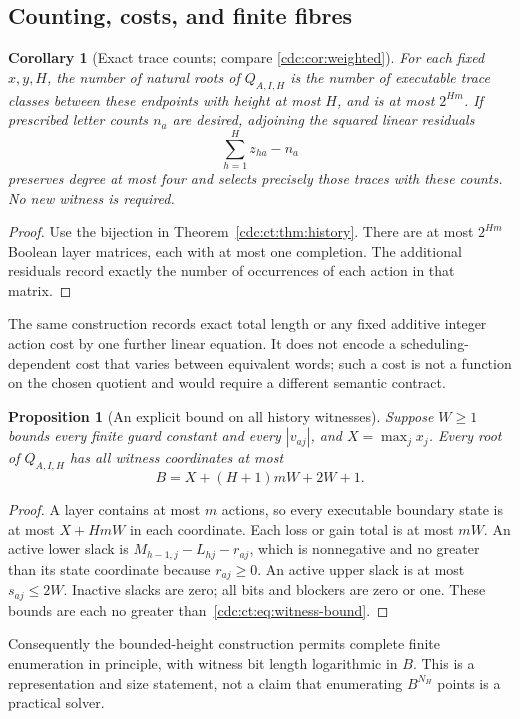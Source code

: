 \documentclass[11pt,a4paper]{article}
\newtheorem{proposition}[proposition]{Proposition}
\newtheorem{corollary}[corollary]{Corollary}
\theoremstyle{definition}
\theoremstyle{remark}
\begin{document}
\subsection{Counting, costs, and finite fibres}
\begin{corollary}[Exact trace counts; compare \cref{cdc:cor:weighted}]\label{cdc:ct:cor:counts}
For each fixed $x,y,H$, the number of natural roots of $Q_{A,I,H}$ is the number of executable trace classes between these endpoints with height at most $H$, and is at most $2^{Hm}$.
If prescribed letter counts $n_a$ are desired, adjoining the squared linear residuals
\[
 \sum_{h=1}^H z_{ha}-n_a
\]
preserves degree at most four and selects precisely those traces with these counts. No new witness is required.
\end{corollary}
\begin{proof}
Use the bijection in Theorem~\ref{cdc:ct:thm:history}. There are at most $2^{Hm}$ Boolean layer matrices, each with at most one completion. The additional residuals record exactly the number of occurrences of each action in that matrix.
\end{proof}
The same construction records exact total length or any fixed additive integer action cost by one further linear equation. It does not encode a scheduling-dependent cost that varies between equivalent words; such a cost is not a function on the chosen quotient and would require a different semantic contract.

\begin{proposition}[An explicit bound on all history witnesses]\label{cdc:ct:prop:witness-bound}
Suppose $W\ge1$ bounds every finite guard constant and every $|v_{aj}|$, and $X=\max_j x_j$. Every root of $Q_{A,I,H}$ has all witness coordinates at most
\begin{equation}\label{cdc:ct:eq:witness-bound}
 B=X+(H+1)mW+2W+1.
\end{equation}
\end{proposition}
\begin{proof}
A layer contains at most $m$ actions, so every executable boundary state is at most $X+HmW$ in each coordinate. Each loss or gain total is at most $mW$. An active lower slack is $M_{h-1,j}-L_{hj}-r_{aj}$, which is nonnegative and no greater than its state coordinate because $r_{aj}\ge0$. An active upper slack is at most $s_{aj}\le2W$. Inactive slacks are zero; all bits and blockers are zero or one. These bounds are each no greater than~\eqref{cdc:ct:eq:witness-bound}.
\end{proof}
Consequently the bounded-height construction permits complete finite enumeration in principle, with witness bit length logarithmic in $B$. This is a representation and size statement, not a claim that enumerating $B^{N_H}$ points is a practical solver.
\end{document}
